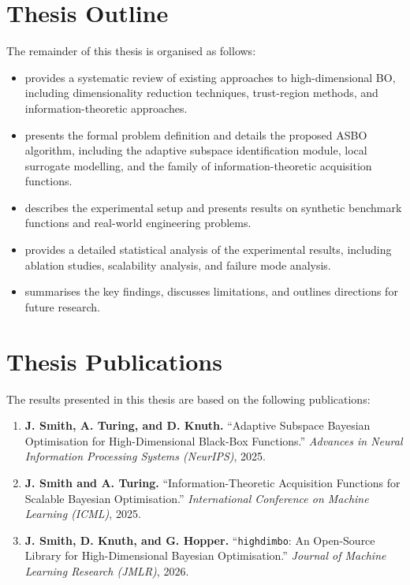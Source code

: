 \section{Thesis Outline}
\label{sec:outline}

The remainder of this thesis is organised as follows:

\begin{itemize}
    \item {} provides a systematic review of existing
    approaches to high-dimensional BO, including dimensionality reduction
    techniques, trust-region methods, and information-theoretic approaches.

    \item {} presents the formal problem definition and
    details the proposed ASBO algorithm, including the adaptive subspace
    identification module, local surrogate modelling, and the family of
    information-theoretic acquisition functions.

    \item {} describes the experimental setup and presents
    results on synthetic benchmark functions and real-world engineering problems.

    \item {} provides a detailed statistical analysis of the
    experimental results, including ablation studies, scalability analysis, and
    failure mode analysis.

    \item {} summarises the key findings, discusses
    limitations, and outlines directions for future research.
\end{itemize}

\section{Thesis Publications}
\label{sec:publications}

The results presented in this thesis are based on the following publications:

\begin{enumerate}
    \item \textbf{J. Smith, A. Turing, and D. Knuth.}
    ``Adaptive Subspace Bayesian Optimisation for High-Dimensional Black-Box
    Functions.''
    \textit{Advances in Neural Information Processing Systems (NeurIPS)}, 2025.

    \item \textbf{J. Smith and A. Turing.}
    ``Information-Theoretic Acquisition Functions for Scalable Bayesian
    Optimisation.''
    \textit{International Conference on Machine Learning (ICML)}, 2025.

    \item \textbf{J. Smith, D. Knuth, and G. Hopper.}
    ``\texttt{highdimbo}: An Open-Source Library for High-Dimensional Bayesian
    Optimisation.''
    \textit{Journal of Machine Learning Research (JMLR)}, 2026.
\end{enumerate}

